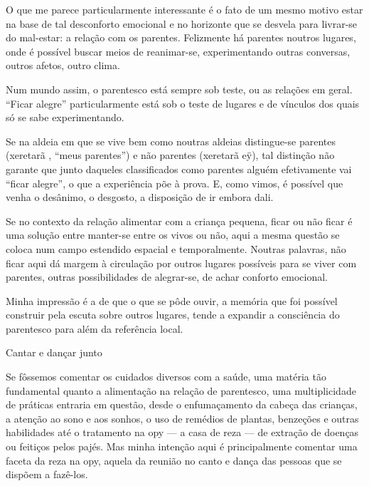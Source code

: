 \documentclass{article}
\begin{document}
O que me parece particularmente interessante \'e o fato de um mesmo
motivo estar na base de tal desconforto emocional e no horizonte que se
desvela para livrar-se do mal-estar: a rela\c{c}\~ao com os parentes.
Felizmente h\'a parentes noutros lugares, onde \'e poss\'ivel buscar
meios de reanimar-se, experimentando outras conversas, outros afetos,
outro clima. 

Num mundo assim, o parentesco est\'a sempre sob teste, ou as
rela\c{c}\~oes em geral. {\textquotedblleft}Ficar
alegre{\textquotedblright} particularmente est\'a sob o teste de
lugares e de v\'inculos dos quais s\'o se sabe experimentando. 

Se na aldeia em que se vive bem como noutras aldeias distingue-se
parentes (xeretar\~a , {\textquotedblleft}meus
parentes{\textquotedblright}) e n\~ao parentes (xeretar\~a e\"y), tal
distin\c{c}\~ao n\~ao garante que junto daqueles classificados como
parentes algu\'em efetivamente vai {\textquotedblleft}ficar
alegre{\textquotedblright}, o que a experi\^encia p\~oe \`a prova. E,
como vimos, \'e poss\'ivel que venha o des\^animo, o desgosto, a
disposi\c{c}\~ao de ir embora dali.

Se no contexto da rela\c{c}\~ao alimentar com a crian\c{c}a pequena,
ficar ou n\~ao ficar \'e uma solu\c{c}\~ao entre manter-se entre os
vivos ou n\~ao, aqui a mesma quest\~ao se coloca num campo estendido
espacial e temporalmente. Noutras palavras, n\~ao ficar aqui d\'a
margem \`a circula\c{c}\~ao por outros lugares poss\'iveis para se
viver com parentes, outras possibilidades de alegrar-se, de achar
conforto emocional. 

Minha impress\~ao \'e a de que o que se p\^ode ouvir, a mem\'oria que
foi poss\'ivel construir pela escuta sobre outros lugares, tende a
expandir a consci\^encia do parentesco para al\'em da refer\^encia
local. 

Cantar e dan\c{c}ar junto

Se f\^ossemos comentar os cuidados diversos com a sa\'ude, uma mat\'eria
t\~ao fundamental quanto a alimenta\c{c}\~ao na rela\c{c}\~ao de
parentesco, uma multiplicidade de pr\'aticas entraria em quest\~ao,
desde o enfuma\c{c}amento da cabe\c{c}a das crian\c{c}as, a
aten\c{c}\~ao ao sono e aos sonhos, o uso de rem\'edios de plantas,
benze\c{c}\~oes e outras habilidades at\'e o tratamento na opy --- a
casa de reza --- de extra\c{c}\~ao de doen\c{c}as ou feiti\c{c}os pelos
paj\'es. Mas minha inten\c{c}\~ao aqui \'e principalmente comentar uma
faceta da reza na opy, aquela da reuni\~ao no canto e dan\c{c}a das
pessoas que se disp\~oem a faz\^e-los.
\end{document}
